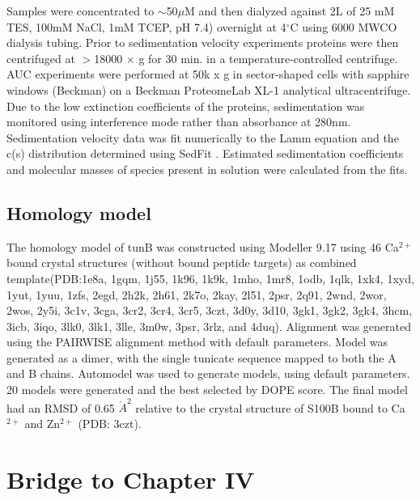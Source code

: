 Samples were concentrated to $\sim$50$\mu$M and then dialyzed against
2L of 25 mM TES, 100mM NaCl, 1mM TCEP, pH 7.4) overnight at 4$^{\circ}$C
using 6000 MWCO dialysis tubing. Prior to sedimentation
velocity experiments proteins were then centrifuged at $>$18000 $\times$
g for 30 min. in a temperature-controlled centrifuge. AUC experiments
were performed at 50k x g in sector-shaped cells with sapphire windows
(Beckman) on a Beckman ProteomeLab XL-1 analytical ultracentrifuge.
Due to the low extinction coefficients of the proteins, sedimentation
was monitored using interference mode rather than absorbance at 280nm.
Sedimentation velocity data was fit numerically to the Lamm equation
and the c(s) distribution determined using SedFit \cite{schuck_size-distribution_2000,brown_macromolecular_2006}.
Estimated sedimentation coefficients and molecular masses of species
present in solution were calculated from the fits.

\subsection{Homology model}

The homology model of tunB was constructed using Modeller 9.17 \cite{webb_comparative_2002}
using 46 Ca$^{2+}$ bound crystal structures (without bound peptide
targets) as combined template(PDB:1e8a, 1gqm, 1j55, 1k96, 1k9k, 1mho,
1mr8, 1odb, 1qlk, 1xk4, 1xyd, 1yut, 1yuu, 1zfs, 2egd, 2h2k, 2h61,
2k7o, 2kay, 2l51, 2psr, 2q91, 2wnd, 2wor, 2wos, 2y5i, 3c1v, 3cga,
3cr2, 3cr4, 3cr5, 3czt, 3d0y, 3d10, 3gk1, 3gk2, 3gk4, 3hcm, 3icb,
3iqo, 3lk0, 3lk1, 3lle, 3m0w, 3psr, 3rlz, and 4duq). Alignment was
generated using the PAIRWISE alignment method with default parameters.
Model was generated as a dimer, with the single tunicate sequence
mapped to both the A and B chains. Automodel was used to generate
models, using default parameters. 20 models were generated and the
best selected by DOPE score. The final model had an RMSD of 0.65 $\mathring{A}^{2}$
relative to the crystal structure of S100B bound to Ca$^{2+}$ and
Zn$^{2+}$ (PDB: 3czt).


\section{Bridge to Chapter IV}


